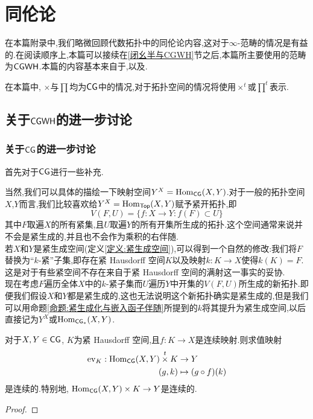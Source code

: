 \chapter{同伦论}
在本篇附录中,我们略微回顾代数拓扑中的同伦论内容,这对于$\infty$-范畴的情况是有益的.在阅读顺序上,本篇可以接续在\ref{闭幺半与CGWH}节之后,本篇所主要使用的范畴为$\mathsf{CGWH}$.本篇的内容基本来自于\parencite[Chapter I]{Mit-AT-II},\cite{StricklandCGWH}以及\cite{李思}.
\begin{wenxintishi}
    在本篇中, $\times$与$\prod$均为$\mathsf{CG}$中的情况,对于拓扑空间的情况将使用$\times^t$或$\prod^t$表示.
\end{wenxintishi}
\section{关于$\mathsf{CGWH}$的进一步讨论}
\subsection{关于$\mathsf{CG}$的进一步讨论}
首先对于$\mathsf{CG}$进行一些补充.

当然,我们可以具体的描绘一下映射空间$Y^X = \operatorname{Hom}_{\mathsf{CG}}(X,Y)$.对于一般的拓扑空间$X$,$Y$而言,我们比较喜欢给$Y^X = \operatorname{Hom}_{\mathsf{Top}}(X,Y)$赋予紧开拓扑,即
\[
  V(F,U) = \{f: X \to Y : f(F) \subset U\}
\]
其中$F$取遍$X$的所有紧集,且$U$取遍$Y$的所有开集所生成的拓扑.这个空间通常来说并不会是紧生成的,并且也不会作为乘积的右伴随.\\
若$X$和$Y$是紧生成空间(定义\ref{定义:紧生成空间}),可以得到一个自然的修改:我们将$F$替换为``$k$-紧''子集,即存在紧 Hausdorff 空间$K$以及映射$k: K \to X$使得$k(K) = F$.这是对于有些紧空间不存在来自于紧 Hausdorff 空间的满射这一事实的妥协.\\
现在考虑$F$遍历全体$X$中的$k$-紧子集而$U$遍历$Y$中开集的$V(F,U)$所生成的新拓扑.即便我们假设$X$和$Y$都是紧生成的,这也无法说明这个新拓扑确实是紧生成的,但是我们可以用命题\ref{命题:紧生成化与嵌入函子伴随}所提到的$k$将其提升为紧生成空间,以后直接记为$Y^X$或$\operatorname{Hom}_{\mathsf{CG}_*}(X,Y)$.
\begin{lemma}
    对于$X,Y\in \mathsf{CG}$, $K$为紧 Hausdorff 空间,且$f: K \to X$是连续映射.则求值映射
    \begin{align*}
    \operatorname{ev}_K : \operatorname{Hom}_{\mathsf{CG}}(X,Y) \overset{t}{\times} K &\to Y\\
    (g,k) &\mapsto (g\circ f)(k)
    \end{align*}
    是连续的.特别地, $\operatorname{Hom}_{\mathsf{CG}}(X,Y) \times K \to Y$是连续的.
\end{lemma}
\begin{proof}
    
\end{proof}
